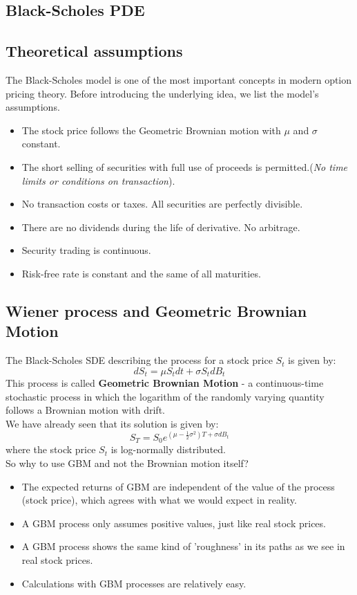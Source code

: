 \documentclass[a4paper]{report}
\begin{document}
\begin{itemize}
\chapter{Black-Scholes PDE}

\section{Theoretical assumptions}


The Black-Scholes model is one of the most important concepts in modern option pricing theory. Before introducing the underlying idea, we list the model’s assumptions.
\begin{itemize}
\item The stock price follows the Geometric Brownian motion with $\mu$ and $\sigma$ constant.
\item The short selling of securities with full use of proceeds is permitted.(\textit{No time limits or conditions on transaction}).
\item No transaction costs or taxes. All securities are perfectly divisible.
\item There are no dividends during the life of derivative.
No arbitrage.
\item Security trading is continuous.
\item Risk-free rate is constant and the same of all maturities. \\
\end{itemize}



\section{ Wiener process and Geometric Brownian Motion}
The Black-Scholes SDE describing the process for a stock price $S_t$ is given by:
\begin{equation}
dS_t = \mu S_t dt + \sigma S_t dB_t
\end{equation} 
This process is called \textbf{Geometric Brownian Motion} - a continuous-time stochastic process in which the logarithm of the randomly varying quantity follows a Brownian motion with drift.\\
We have already seen that its solution is given by:
\begin{equation}
S_T  =S_0 e^{(\mu - \frac{1}{2} \sigma^2)T+\sigma dB_t }
\end{equation}
where the stock price $S_t$ is log-normally distributed.\\
So why to use GBM and not the Brownian motion itself?
\begin{itemize}
\item The expected returns of GBM are independent of the value of the process (stock price), which agrees with what we would expect in reality.
\item A GBM process only assumes positive values, just like real stock prices.
\item A GBM process shows the same kind of 'roughness' in its paths as we see in real stock prices.
\item Calculations with GBM processes are relatively easy.
\end{itemize}



\end{itemize}
\end{document}
